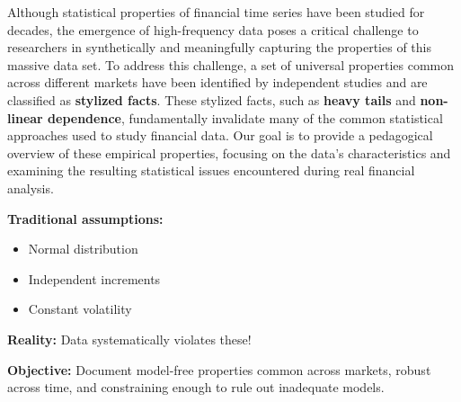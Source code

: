\documentclass[final]{beamer}
\begin{document}
\begin{frame}[t]
\begin{columns}[t]
\begin{column}{.48\linewidth}
\vspace{0.5cm}

\begin{tcolorbox}[mybox, title=Motivation]
\large
Although statistical properties of financial time series have been studied for decades, the emergence of high-frequency data poses a critical challenge to researchers in synthetically and meaningfully capturing the properties of this massive data set.
To address this challenge, a set of universal properties common across different markets have been identified by independent studies and are classified as \textbf{stylized facts}.
These stylized facts, such as \textbf{heavy tails} and \textbf{non-linear dependence}, fundamentally invalidate many of the common statistical approaches used to study financial data.
Our goal is to provide a pedagogical overview of these empirical properties, focusing on the data's characteristics and examining the resulting statistical issues encountered during real financial analysis.



\end{tcolorbox}

\vspace{0.5cm}

\begin{tcolorbox}[mybox, title=Problem Statement]
\large
\textbf{Traditional assumptions:}
\begin{itemize}
\item Normal distribution
\item Independent increments  
\item Constant volatility
\end{itemize}

\vspace{0.2cm}
\textbf{Reality:} Data systematically violates these!

\vspace{0.2cm}
\textbf{Objective:} Document model-free properties common across markets, robust across time, and constraining enough to rule out inadequate models.
\end{tcolorbox}


\end{column}
\end{columns}
\end{frame}
\end{document}
